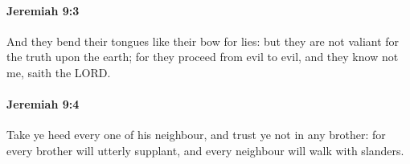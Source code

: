 		\paragraph{Jeremiah 9:3} %
			\label{JEREMIAH-9-3}

			And they bend their tongues like their bow for lies: but they are not valiant for the truth upon the earth; for they proceed from evil to evil, and they know not me, saith the LORD.


		\paragraph{Jeremiah 9:4} %
			\label{JEREMIAH-9-4}

			Take ye heed every one of his neighbour, and trust ye not in any brother: for every brother will utterly supplant, and every neighbour will walk with slanders.



